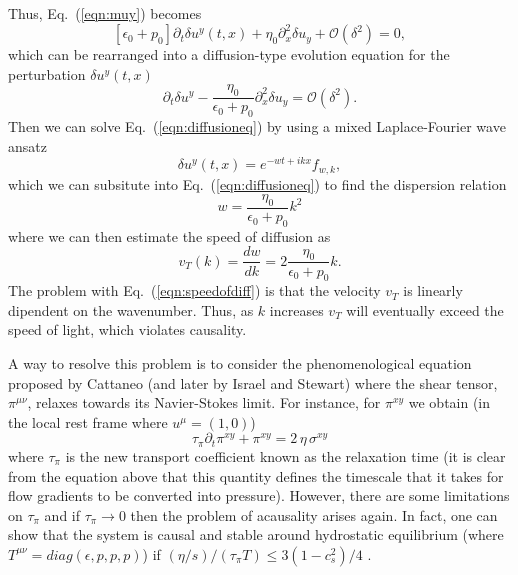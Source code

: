 \documentclass[aps,article]{revtex4}
\begin{document}
Thus, Eq.\ (\ref{eqn:muy}) becomes
\begin{equation}
\left[\epsilon_0+p_0\right] \partial_t \delta u^y(t,x)+\eta_0\partial^2_{x}\delta u_{y}+\mathcal{O}(\delta^2)=0,
\end{equation}
which can be rearranged into a diffusion-type evolution equation for the perturbation $\delta u^y (t,x)$
\begin{equation}\label{eqn:diffusioneq}
\partial_t\delta u^y-\frac{\eta_0}{\epsilon_0+p_0}\partial^2_{x}\delta u_{y}=\mathcal{O}(\delta^2).
\end{equation}
Then we can solve Eq.\ (\ref{eqn:diffusioneq}) by using a mixed Laplace-Fourier wave ansatz
\begin{equation}
\delta u^y(t,x)=e^{-wt+ikx}f_{w,k}, 
\end{equation}
which we can subsitute into Eq.\ (\ref{eqn:diffusioneq}) to find the dispersion relation
\begin{equation}
w=\frac{\eta_0}{\epsilon_0+p_0}k^2
\end{equation}
where we can then estimate the speed of diffusion as
\begin{equation}\label{eqn:speedofdiff}
v_T(k)=\frac{dw}{dk}=2\frac{\eta_0}{\epsilon_0+p_0}k.
\end{equation}
The problem with Eq.\ (\ref{eqn:speedofdiff}) is that the velocity $v_T$ is linearly dipendent on the wavenumber.  Thus, as $k$ increases $v_T$ will eventually exceed the speed of light, which violates causality.

A way to resolve this problem is to consider the phenomenological equation proposed by Cattaneo (and later by Israel and Stewart) where the shear tensor, $\pi^{\mu\nu}$, relaxes towards its Navier-Stokes limit. For instance, for $\pi^{xy}$ we obtain (in the local rest frame where $u^{\mu}=(1,0)$)
\begin{equation}
\tau_{\pi}\partial_{t}\pi^{xy}+\pi^{xy}=2\,\eta\,\sigma^{xy}
\end{equation}
where $\tau_{\pi}$ is the new transport coefficient known as the relaxation time (it is clear from the equation above that this quantity defines the timescale that it takes for flow gradients to be converted into pressure). However, there are some limitations on $\tau_{\pi}$ and if $\tau_{\pi}\rightarrow 0$ then the problem of acausality arises again. In fact, one can show that the system is causal and stable around hydrostatic equilibrium (where $T^{\mu\nu}=diag(\epsilon,p,p,p)$) if $(\eta/s)/(\tau_{\pi}T) \leq 3(1-c_s^2)/4$ \cite{tomoi}. 
\end{document}
